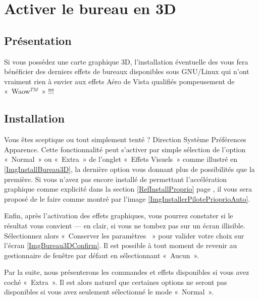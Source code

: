 \section{Activer le bureau en 3D}
\label{RefBureau3D}
\subsection{Présentation}
Si vous possédez une carte graphique 3D, l'installation éventuelle  des   vous fera bénéficier des derniers effets de bureaux disponibles sous GNU/Linux qui n'ont vraiment rien à envier aux effets Aéro de Vista qualifiés pompeusement de «~Waow$^{TM}$~» !!!\par
\subsection{Installation}
Vous êtes sceptique ou tout simplement tenté ? Direction Système \FlecheDroite Préférences \FlecheDroite Apparence. Cette fonctionnalité peut s'activer par simple sélection de l'option «~Normal~» ou «~Extra~» de l'onglet «~Effets Visuels~» comme illustré en \ref{ImgInstallBureau3D}, la dernière option vous donnant plus de possibilités que la première. Si vous n'avez pas encore installé de  permettant l'accélération graphique comme explicité dans la section \ref{RefInstallProprio} page \pageref{RefInstallProprio}, il vous sera proposé de le faire comme montré par l'image \ref{ImgInstallerPilotePrioprioAuto}.\par
\InstallBureauTroisD
Enfin, après l'activation des effets graphiques, vous pourrez constater si le résultat vous convient --- en clair, si vous ne tombez pas sur un écran illisible. Sélectionnez alors «~Conserver les paramètres ~» pour valider votre choix sur l'écran \ref{ImgBureau3DConfirm}. Il est possible à tout moment de revenir au gestionnaire de fenêtre par défaut en sélectionnant «~Aucun~».
\begin{attention}
Par la suite, nous présenterons les commandes et effets disponibles si vous avez coché «~Extra~». Il est alors naturel que certaines options ne seront pas disponibles si vous avez seulement sélectionné le mode «~Normal~».
\end{attention}
